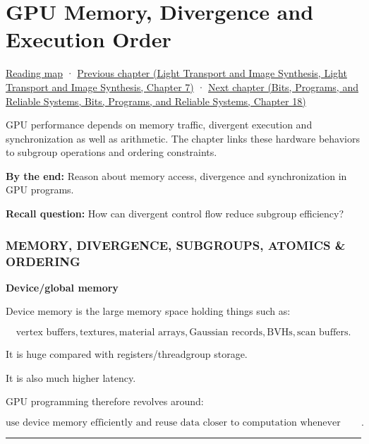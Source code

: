 \hypertarget{03-visual-computing-i-ch016}{}
\chapter{GPU Memory, Divergence and Execution Order}\label{stagechapter:03-visual-computing-i-ch016}\label{03-visual-computing-i-ch016-gpu-memory-divergence-and-execution-order}

\hyperref[volume-reading-map]{Reading map} · \href{../04-Light-Transport-and-Image-Synthesis/main.pdf\#nameddest=03-visual-computing-i-ch015-rasterization-foundations-and-renderer-evidence}{Previous chapter (Light Transport and Image Synthesis, Light Transport and Image Synthesis, Chapter 7)} · \href{../01-Bits-Programs-and-Reliable-Systems/main.pdf\#nameddest=03-visual-computing-i-ch017-build-test-and-reproduce-the-program}{Next chapter (Bits, Programs, and Reliable Systems, Bits, Programs, and Reliable Systems, Chapter 18)}

GPU performance depends on memory traffic, divergent execution and synchronization as well as arithmetic. The chapter links these hardware behaviors to subgroup operations and ordering constraints.

\textbf{By the end:} Reason about memory access, divergence and synchronization in GPU programs.

\textbf{Recall question:} How can divergent control flow reduce subgroup efficiency?

\subsection{MEMORY, DIVERGENCE, SUBGROUPS, ATOMICS \& ORDERING}\label{03-visual-computing-i-ch016-memory-divergence-subgroups-atomics-ordering}

\textbf{Device/global memory}

Device memory is the large memory space holding things such as:

\[
\text{vertex buffers},
\text{textures},
\text{material arrays},
\text{Gaussian records},
\text{BVHs},
\text{scan buffers}.
\]

It is huge compared with registers/threadgroup storage.

It is also much higher latency.

GPU programming therefore revolves around:

\[
\boxed{
\text{use device memory efficiently and reuse data closer to computation whenever possible}.
}
\]

\begin{center}\rule{0.5\linewidth}{0.5pt}\end{center}

